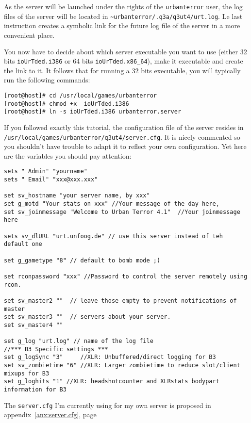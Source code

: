 As the server will be launched under the rights of the \texttt{urbanterror}
user, the log files of the server will be located  in
\verb!~urbanterror/.q3a/q3ut4/urt.log!. 
Le last instruction creates a symbolic link for the future log file of the
server in a more convenient place. 

\noindent You now have to decide about which server executable you want to use (either 32
bits \texttt{ioUrTded.i386} or 64 bits \texttt{ioUrTded.x86\_64}), make it
executable and create the link to it. 
It follows that for running a 32 bits executable, you will typically run the
following commands: 
\begin{lstlisting}[style=command]
[root@host]# cd /usr/local/games/urbanterror
[root@host]# chmod +x  ioUrTded.i386
[root@host]# ln -s ioUrTded.i386 urbanterror.server  
\end{lstlisting}

\noindent If you followed exactly this tutorial, the configuration file of the server
resides in  
\texttt{/usr/local/games/urbanterror/q3ut4/server.cfg}. 
It is nicely commented so you shouldn't have trouble to adapt it to reflect your
own configuration. 
Yet here are the variables you should pay attention: 
\begin{lstlisting}[style=urtcfg]
sets " Admin" "yourname" 
sets " Email" "xxx@xxx.xxx"

set sv_hostname "your server name, by xxx" 
set g_motd "Your stats on xxx" //Your message of the day here, 
set sv_joinmessage "Welcome to Urban Terror 4.1"  //Your joinmessage here

sets sv_dlURL "urt.unfoog.de" // use this server instead of teh default one

set g_gametype "8" // default to bomb mode ;)

set rconpassword "xxx" //Password to control the server remotely using rcon.

set sv_master2 ""  // leave those empty to prevent notifications of master 
set sv_master3 ""  // servers about your server. 
set sv_master4 ""

set g_log "urt.log" // name of the log file
//*** B3 Specific settings ***
set g_logSync "3"     //XLR: Unbuffered/direct logging for B3
set sv_zombietime "6" //XLR: Larger zombietime to reduce slot/client mixups for B3
set g_loghits "1" //XLR: headshotcounter and XLRstats bodypart information for B3
\end{lstlisting}

The \texttt{server.cfg} I'm currently using for my own server is proposed in
appendix~\ref{anx:server.cfg}, page~\pageref{anx:server.cfg}\\

